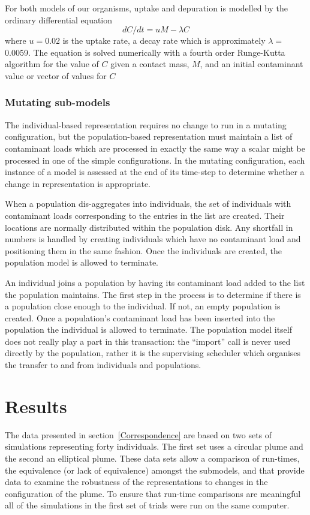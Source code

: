 For both models of our organisms, uptake and depuration is modelled by the
ordinary differential equation
\[ d C / d t = u M - \lambda C \]
where $u = 0.02$ is the uptake rate, a decay rate which is approximately
$\lambda =$0.0059. The equation is solved numerically with a fourth order
Runge-Kutta algorithm for the value of $C$ given a contact mass, $M$, and an
initial contaminant value or vector of values for $C$

\subsubsection{Mutating sub-models}

The individual-based representation requires no change to run in a mutating
configuration, but the population-based representation must maintain a list of
contaminant loads which are processed in exactly the same way a scalar might
be processed in one of the simple configurations. In the mutating
configuration, each instance of a model is assessed at the end of its time-step
to determine whether a change in representation is appropriate.

When a population dis-aggregates into individuals, the set of individuals with
contaminant loads corresponding to the entries in the list are created. Their
locations are normally distributed within the population disk. Any shortfall
in numbers is handled by creating individuals which have no contaminant load
and positioning them in the same fashion. Once the individuals are created,
the population model is allowed to terminate.

An individual joins a population by having its contaminant load added to the
list the population maintains. The first step in the process is to determine
if there is a population close enough to the individual. If not, an empty
population is created. Once a population's contaminant load has been inserted
into the population the individual is allowed to terminate. The population
model itself does not really play a part in this transaction: the ``import''
call is never used directly by the population, rather it is the supervising
scheduler which organises the transfer to and from individuals and
populations.

\section{Results}\label{Results}

The data presented in section~\ref{Correspondence} are based on two sets of
simulations representing forty individuals. The first set uses a circular
plume and the second an elliptical plume. These data sets allow a comparison
of run-times, the equivalence (or lack of equivalence) amongst the submodels,
and that provide data to examine the robustness of the representations to
changes in the configuration of the plume. To ensure that run-time comparisons
are meaningful all of the simulations in the first set of trials were run on
the same computer.

